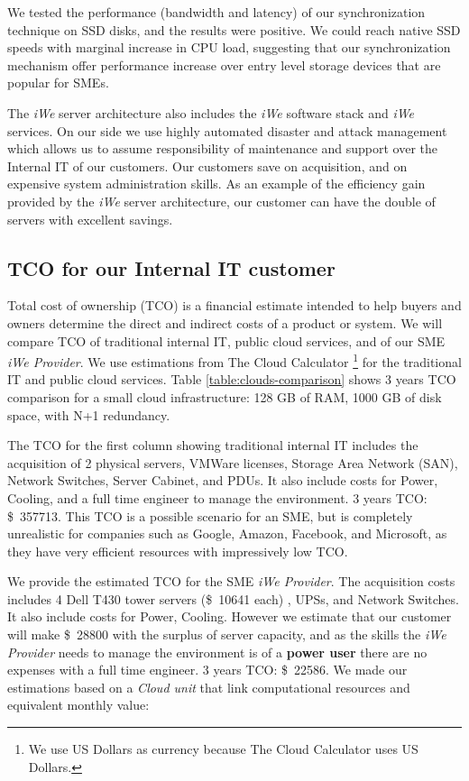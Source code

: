 We tested the performance (bandwidth and latency) of our synchronization
technique on SSD disks, and the results were positive. We could reach
native SSD speeds with marginal increase in CPU load, suggesting that our
synchronization mechanism offer performance increase over entry level storage
devices that are popular for SMEs.

The \textit{iWe} server architecture also includes the \textit{iWe}
software stack and \textit{iWe} services. On our side we use highly automated
disaster and attack management which allows us to assume responsibility of
maintenance and support over the Internal IT of our customers. Our customers
save on acquisition, and on expensive system administration skills. As an
example of the efficiency gain provided by the \textit{iWe} server
architecture, our customer can have the double of servers with excellent
savings.

\subsection{TCO for our Internal IT customer} 
\label{subsec:tco}


Total cost of ownership (TCO) is a financial estimate intended to help buyers
and owners determine the direct and indirect costs of a product or system.  We
will compare TCO of traditional internal IT, public cloud services, and of our
SME \textit{iWe Provider}. We use estimations from The Cloud
Calculator \cite{tcc} \footnote{We use US Dollars as currency because The Cloud
Calculator uses US Dollars.} for the traditional IT and public cloud services.
Table \ref{table:clouds-comparison} shows 3 years TCO comparison for a small
cloud infrastructure: 128 GB of RAM, 1000 GB of disk space, with N+1 redundancy. 

The TCO for the first column showing traditional internal IT includes the
acquisition of 2 physical servers, VMWare licenses, Storage Area Network (SAN),
Network Switches, Server Cabinet, and PDUs. It also include costs for Power,
Cooling, and a full time engineer to manage the environment. 3 years TCO:
\SI{357713}[\$]{}. This TCO is a possible scenario for an SME, but is completely
unrealistic for companies such as Google, Amazon, Facebook, and Microsoft, as
they have very efficient resources with impressively low TCO.

We provide the estimated TCO for the SME \textit{iWe Provider}.  The
acquisition costs includes 4 Dell T430 tower servers (\SI{10641}[\$]{}
each) \cite{T430}, UPSs, and Network Switches. It also include costs for Power,
Cooling. However we estimate that our customer will make \SI{28800}[\$]{} with
the surplus of server capacity, and as the skills the \textit{iWe Provider}
needs to manage the environment is of a \textbf{power user} there are no
expenses with a full time engineer. 3 years TCO: \SI{22586}[\$]{}. We made our
estimations based on a \textit{Cloud unit} that link computational resources and
equivalent monthly value:

